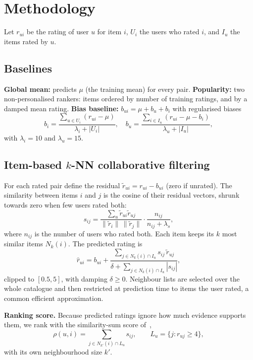 \documentclass[conference]{IEEEtran}
\begin{document}
\section{Methodology}
\label{sec:models}
Let $r_{ui}$ be the rating of user $u$ for item $i$, $U_i$ the users who rated $i$, and $I_u$ the items rated by $u$.

\subsection{Baselines}
\textbf{Global mean:} predicts $\mu$ (the training mean) for every pair. \textbf{Popularity:} two non-personalised rankers: items ordered by number of training ratings, and by a damped mean rating. \textbf{Bias baseline:} $b_{ui}=\mu+b_u+b_i$ with regularised biases
\begin{equation}
b_i=\frac{\sum_{u\in U_i}(r_{ui}-\mu)}{\lambda_i+|U_i|},\quad
b_u=\frac{\sum_{i\in I_u}(r_{ui}-\mu-b_i)}{\lambda_u+|I_u|},
\end{equation}
with $\lambda_i=10$ and $\lambda_u=15$.

\subsection{Item-based $k$-NN collaborative filtering}
For each rated pair define the residual $\tilde r_{ui}=r_{ui}-b_{ui}$ (zero if unrated). The similarity between items $i$ and $j$ is the cosine of their residual vectors, shrunk towards zero when few users rated both:
\begin{equation}
s_{ij}=\frac{\sum_{u}\tilde r_{ui}\tilde r_{uj}}{\lVert\tilde r_{i}\rVert\,\lVert\tilde r_{j}\rVert}\cdot\frac{n_{ij}}{n_{ij}+\lambda_s},
\end{equation}
where $n_{ij}$ is the number of users who rated both. Each item keeps its $k$ most similar items $N_k(i)$. The predicted rating is
\begin{equation}
\hat r_{ui}=b_{ui}+\frac{\sum_{j\in N_k(i)\cap I_u}s_{ij}\,\tilde r_{uj}}{\delta+\sum_{j\in N_k(i)\cap I_u}|s_{ij}|},
\end{equation}
clipped to $[0.5,5]$, with damping $\delta\ge 0$. Neighbour lists are selected over the whole catalogue and then restricted at prediction time to items the user rated, a common efficient approximation.

\textbf{Ranking score.} Because predicted ratings ignore how much evidence supports them, we rank with the similarity-sum score of~\cite{deshpande2004},
\begin{equation}
\rho(u,i)=\sum_{j\in N_{k'}(i)\cap L_u}s_{ij},\qquad L_u=\{j:r_{uj}\ge 4\},
\end{equation}
with its own neighbourhood size $k'$.
\end{document}
